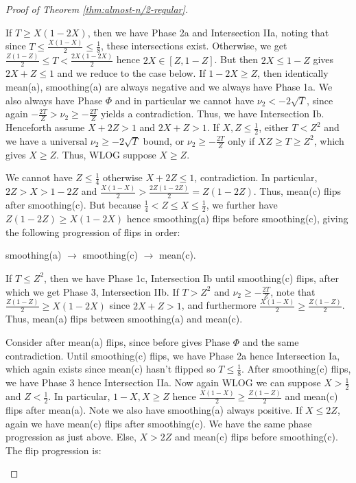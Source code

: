 \documentclass[11pt]{article}
\begin{document}
\begin{proof}[Proof of Theorem \ref{thm:almost-n/2-regular}]
\begin{outline}
        If $T \ge X(1-2X)$, then we have Phase 2a and Intersection IIa, noting that since $T \le \frac{X(1-X)}{2} \le \frac18$, these intersections exist. Otherwise, we get $\frac{Z(1-Z)}{2} \le T < \frac{2X(1-2X)}{2}$ hence $2X \in [Z, 1-Z]$. But then $2X \le 1-Z$ gives $2X + Z \le 1$ and we reduce to the case below.
        \1[-] If $1-2X \ge Z$, then identically mean(a), smoothing(a) are always negative and we always have Phase 1a. We also always have Phase $\Phi$ and in particular we cannot have $\nu_2 < -2\sqrt{T}$, since again $-\frac{2T}{Z} > \nu_2 \ge -\frac{2T}Z$ yields a contradiction. Thus, we have Intersection Ib. 
        \1[-] Henceforth assume $X+2Z > 1$ and $2X+Z > 1$. 
        \1[-] If $X, Z \le \frac12$, either $T < Z^2$ and we have a universal $\nu_2 \ge -2\sqrt{T}$ bound, or $\nu_2 \ge -\frac{2T}{Z}$ only if $XZ \ge T \ge Z^2$, which gives $X \ge Z$. Thus, WLOG suppose $X \ge Z$. 

        We cannot have $Z \le \frac14$ otherwise $X + 2Z \le 1$, contradiction. In particular, $2Z > X > 1-2Z$ and $\frac{X(1-X)}{2} > \frac{2Z(1-2Z)}{2} = Z(1-2Z)$. Thus, mean(c) flips after smoothing(c). But because $\frac14 < Z \le X \le \frac12$, we further have $Z(1-2Z) \ge X(1-2X)$ hence smoothing(a) flips before smoothing(c), giving the following progression of flips in order:
    
        \centerline{smoothing(a) $\to$ smoothing(c) $\to$ mean(c).}
        \2[-] If $T \le Z^2$, then we have Phase 1c, Intersection Ib until smoothing(c) flips, after which we get Phase 3, Intersection IIb.
        \2[-] If $T > Z^2$ and $\nu_2 \ge -\frac{2T}{Z}$, note that $\frac{Z(1-Z)}{2} \ge X(1-2X)$ since $2X + Z > 1$, and furthermore $\frac{X(1-X)}{2} \ge \frac{Z(1-Z)}{2}$. Thus, mean(a) flips between smoothing(a) and mean(c). 

        Consider after mean(a) flips, since before gives Phase $\Phi$ and the same contradiction. Until smoothing(c) flips, we have Phase 2a hence Intersection Ia, which again exists since mean(c) hasn't flipped so $T \le \frac18$. After smoothing(c) flips, we have Phase 3 hence Intersection IIa. 
        \1[-] Now again WLOG we can suppose $X > \frac12$ and $Z < \frac12$. In particular, $1-X, X \ge Z$ hence $\frac{X(1-X)}{2} \ge \frac{Z(1-Z)}{2}$ and mean(c) flips after mean(a). Note we also have smoothing(a) always positive. 
        \2[-] If $X \le 2Z$, again we have mean(c) flips after smoothing(c). We have the same phase progression as just above. 
        \2[-] Else, $X > 2Z$ and mean(c) flips before smoothing(c). The flip progression is:


\end{outline}
\end{proof}
\end{document}
